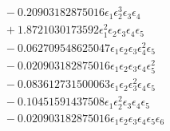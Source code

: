 \documentclass[10pt]{article}
\begin{document}
\begin{align*}
&{}  - 0.20903182875016 \epsilon_{1} \epsilon_{2}^{3} \epsilon_{3} \epsilon_{4} \\
&{}  + 1.8721030173592 \epsilon_{1}^{2} \epsilon_{2} \epsilon_{3} \epsilon_{4} \epsilon_{5} \\
&{}  - 0.062709548625047 \epsilon_{1} \epsilon_{2} \epsilon_{3} \epsilon_{4}^{2} \epsilon_{5} \\
&{}  - 0.020903182875016 \epsilon_{1} \epsilon_{2} \epsilon_{3} \epsilon_{4} \epsilon_{5}^{2} \\
&{}  - 0.083612731500063 \epsilon_{1} \epsilon_{2} \epsilon_{3}^{2} \epsilon_{4} \epsilon_{5} \\
&{}  - 0.10451591437508 \epsilon_{1} \epsilon_{2}^{2} \epsilon_{3} \epsilon_{4} \epsilon_{5} \\
&{}  - 0.020903182875016 \epsilon_{1} \epsilon_{2} \epsilon_{3} \epsilon_{4} \epsilon_{5} \epsilon_{6}
\end{align*}
\end{document}
